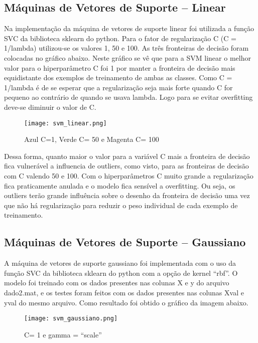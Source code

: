 \documentclass[12pt]{article}
\begin{document}
\subsection{Máquinas de Vetores de Suporte – Linear}

Na implementação da máquina de vetores de suporte linear foi utilizada a função SVC da biblioteca sklearn do python. Para o fator de regularização C (C = 1/lambda) utilizou-se os valores 1, 50 e 100. As três fronteiras de decisão foram colocadas no gráfico abaixo. Neste gráfico se vê que para a SVM linear o melhor valor para o hiperparâmetro C foi 1 por manter a fronteira de decisão mais equidistante dos exemplos de treinamento de ambas as classes. Como C = 1/lambda é de se esperar que a regularização seja mais forte quando C for pequeno ao contrário de quando se usava lambda. Logo para se evitar overfitting deve-se diminuir o valor de C.

\begin{figure} [htp]
\begin{center}
\texttt{[image: svm\_linear.png]}
\caption{Azul C=1, Verde C= 50 e Magenta C= 100} \label{svm_linear}
\end{center}
\end{figure}

Dessa forma, quanto maior o valor para a variável C mais a fronteira de decisão fica vulnerável a influencia de outliers, como visto, para as fronteiras de decisão com C valendo 50 e 100. Com o hiperparâmetros C muito grande a regularização fica praticamente anulada e o modelo fica sensível a overfitting. Ou seja, os outliers terão grande influência sobre o desenho da fronteira de decisão uma vez que não há regularização para reduzir o peso individual de cada exemplo de treinamento.

\subsection{Máquinas de Vetores de Suporte – Gaussiano}

A máquina de vetores de suporte gaussiano foi implementada com o uso da função SVC da biblioteca sklearn do python com a opção de kernel “rbf”. O modelo foi treinado com os dados presentes nas colunas X e y do arquivo dado2.mat, e os testes foram feitos com os dados presentes nas colunas Xval e yval do mesmo arquivo. Como resultado foi obtido o gráfico da imagem abaixo.

\begin{figure} [htp]
\begin{center}
\texttt{[image: svm\_gaussiano.png]}
\caption{C= 1 e gamma = “scale”} \label{svm_gaussiano}
\end{center}
\end{figure}
\end{document}
